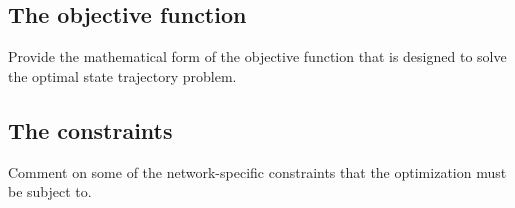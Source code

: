 \subsection{The objective function} Provide the mathematical form of the objective function that is designed to solve the optimal state trajectory problem.
\subsection{The constraints} Comment on some of the network-specific constraints that the optimization must be subject to.

